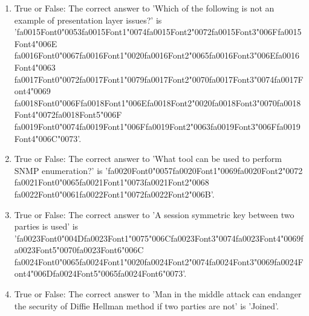 \documentclass[12pt]{article}
\begin{document}
\begin{enumerate}[label=\arabic*.]
\item True or False: The correct answer to 'Which of the following is not an example of presentation layer issues?' is '{\csname fa0015Font0\endcsname\char"0053}{\csname fa0015Font1\endcsname\char"0074}{\csname fa0015Font2\endcsname\char"0072}{\csname fa0015Font3\endcsname\char"006F}{\csname fa0015Font4\endcsname\char"006E} {\csname fa0016Font0\endcsname\char"0067}{\csname fa0016Font1\endcsname\char"0020}{\csname fa0016Font2\endcsname\char"0065}{\csname fa0016Font3\endcsname\char"006E}{\csname fa0016Font4\endcsname\char"0063} {\csname fa0017Font0\endcsname\char"0072}{\csname fa0017Font1\endcsname\char"0079}{\csname fa0017Font2\endcsname\char"0070}{\csname fa0017Font3\endcsname\char"0074}{\csname fa0017Font4\endcsname\char"0069} {\csname fa0018Font0\endcsname\char"006F}{\csname fa0018Font1\endcsname\char"006E}{\csname fa0018Font2\endcsname\char"0020}{\csname fa0018Font3\endcsname\char"0070}{\csname fa0018Font4\endcsname\char"0072}{\csname fa0018Font5\endcsname\char"006F} {\csname fa0019Font0\endcsname\char"0074}{\csname fa0019Font1\endcsname\char"006F}{\csname fa0019Font2\endcsname\char"0063}{\csname fa0019Font3\endcsname\char"006F}{\csname fa0019Font4\endcsname\char"006C}{\char"0073}'.
\item True or False: The correct answer to 'What tool can be used to perform SNMP enumeration?' is '{\csname fa0020Font0\endcsname\char"0057}{\csname fa0020Font1\endcsname\char"0069}{\csname fa0020Font2\endcsname\char"0072} {\csname fa0021Font0\endcsname\char"0065}{\csname fa0021Font1\endcsname\char"0073}{\csname fa0021Font2\endcsname\char"0068} {\csname fa0022Font0\endcsname\char"0061}{\csname fa0022Font1\endcsname\char"0072}{\csname fa0022Font2\endcsname\char"006B}'.
\item True or False: The correct answer to 'A session symmetric key between two parties is used' is '{\csname fa0023Font0\endcsname\char"004D}{\csname fa0023Font1\endcsname\char"0075}{\char"006C}{\csname fa0023Font3\endcsname\char"0074}{\csname fa0023Font4\endcsname\char"0069}{\csname fa0023Font5\endcsname\char"0070}{\csname fa0023Font6\endcsname\char"006C} {\csname fa0024Font0\endcsname\char"0065}{\csname fa0024Font1\endcsname\char"0020}{\csname fa0024Font2\endcsname\char"0074}{\csname fa0024Font3\endcsname\char"0069}{\csname fa0024Font4\endcsname\char"006D}{\csname fa0024Font5\endcsname\char"0065}{\csname fa0024Font6\endcsname\char"0073}'.
\item True or False: The correct answer to 'Man in the middle attack can endanger the security of Diffie Hellman method if two parties are not' is 'Joined'.

\end{enumerate}
\end{document}
